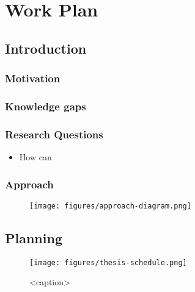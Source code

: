 \chapter{Work Plan}


\section{Introduction}
\subsection{Motivation}
\subsection{Knowledge gaps}
\subsection{Research Questions}

\begin{itemize}
  \item How can 
\end{itemize}


\subsection{Approach}
\begin{figure}
  \centering
  \label{fig:approach}
  \texttt{[image: figures/approach-diagram.png]}
\end{figure}


\section{Planning}

\begin{figure}[htbp]
  \centering
  \texttt{[image: figures/thesis-schedule.png]}
  \caption{<caption>}
  \label{<label>}
\end{figure}